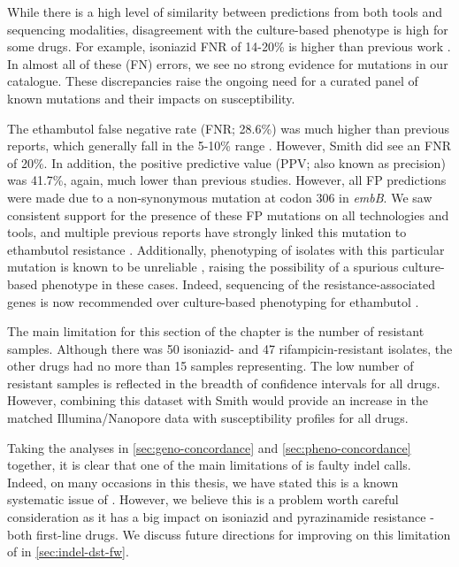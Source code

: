 While there is a high level of similarity between predictions from both tools and sequencing modalities, disagreement with the culture-based phenotype is high for some drugs. For example, isoniazid FNR of 14-20\% is higher than previous work \cite{hunt2019,cryptic2018}. In almost all of these (FN) errors, we see no strong evidence for mutations in our catalogue. These discrepancies raise the ongoing need for a curated panel of known mutations and their impacts on susceptibility. 

The ethambutol false negative rate (FNR; 28.6\%) was much higher than previous reports, which generally fall in the 5-10\% range \cite{cryptic2018,hunt2019,smith2020}. However, Smith \etal{} did see an FNR of 20\%. In addition, the positive predictive value (PPV; also known as precision) was 41.7\%, again, much lower than previous studies. However, all FP predictions were made due to a non-synonymous mutation at codon 306 in \textit{embB}. We saw consistent support for the presence of these FP mutations on all technologies and tools, and multiple previous reports have strongly linked this mutation to ethambutol resistance \cite{Maningi2017,Srivastava2009,Brossier2015}. Additionally, phenotyping of isolates with this particular mutation is known to be unreliable \cite{Zhang2014,walker2015,Sirgel2013}, raising the possibility of a spurious culture-based phenotype in these cases. Indeed, sequencing of the resistance-associated genes is now recommended over culture-based phenotyping for ethambutol \cite{who2018technical}.

The main limitation for this section of the chapter is the number of resistant samples. Although there was 50 isoniazid- and 47 rifampicin-resistant isolates, the other drugs had no more than 15 samples representing. The low number of resistant samples is reflected in the breadth of confidence intervals for all drugs. However, combining this dataset with Smith \etal{} \cite{smith2020} would provide an increase in the matched Illumina/Nanopore data with susceptibility profiles for all drugs.

\noindent
Taking the analyses in \autoref{sec:geno-concordance} and \autoref{sec:pheno-concordance} together, it is clear that one of the main limitations of \drprg{} is faulty indel calls. Indeed, on many occasions in this thesis, we have stated this is a known systematic issue of \ont{} \cite{watson2019}. However, we believe this is a problem worth careful consideration as it has a big impact on isoniazid and pyrazinamide resistance - both first-line \mtb{} drugs. We discuss future directions for improving on this limitation of \drprg{} in \autoref{sec:indel-dst-fw}.

